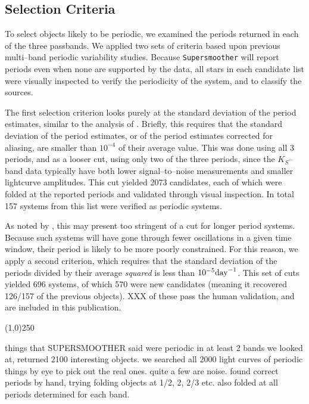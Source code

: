 \documentclass[]{emulateapj}
\begin{document}

\subsection{Selection Criteria}
To select objects likely to be periodic, we examined the periods
returned in each of the three passbands.  We applied two sets of
criteria based upon previous multi--band periodic variability
studies.  Because {\tt Supersmoother} will report periods even when
none are supported by the data, all stars in each candidate list were
visually inspected to verify the periodicity of the system, and to
classify the sources.

The first selection criterion looks purely at the standard deviation
of the period estimates, similar to the analysis of
\cite{2011ApJ...731...17B}.  Briefly, this requires that the standard
deviation of the period estimates, or of the period estimates
corrected for aliasing, are smaller than $10^{-4}$ of their average
value. This was done using all 3 periods, and as a looser cut, using
only two of the three periods, since the $K_S$--band data typically
have both lower signal--to--noise measurements and smaller lightcurve
amplitudes.  This cut yielded 2073 candidates, each of which were
folded at the reported periods and validated through visual
inspection.  In total 157 systems from this list were verified as
periodic systems.

As noted by \cite{2012AJ....144....9O}, this may present too stringent
of a cut for longer period systems.  Because such systems will have
gone through fewer oscillations in a given time window, their period
is likely to be more poorly constrained.  For this reason, we apply a
second criterion, which requires that the standard deviation of the
periods divided by their average {\it squared} is less than $10^{-5}
{\rm day}^{-1}$.  This set of cuts yielded 696 systems, of which 570
were new candidates (meaning it recovered 126/157 of the previous
objects).  XXX of these pass the human validation, and are included in
this publication.

\begin{center}
{\color{red} \line(1,0){250}}
\end{center}

things that SUPERSMOOTHER said were periodic in at least 2 bands we looked at, returned 2100 interesting objects. we searched all 2000 light curves of periodic things by eye to pick out the real ones. quite a few are noise. found correct periods by hand, trying folding objects at 1/2, 2, 2/3 etc. also folded at all periods determined for each band.  
\end{document}
